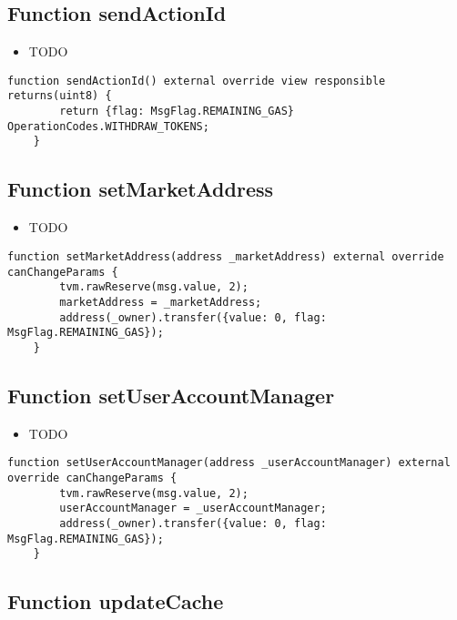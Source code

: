 \subsection{Function sendActionId}

\noindent\begin{itemize}
\item TODO
\end{itemize}

\begin{lstlisting}[firstnumber=59]
    function sendActionId() external override view responsible returns(uint8) {
        return {flag: MsgFlag.REMAINING_GAS} OperationCodes.WITHDRAW_TOKENS;
    }
\end{lstlisting}

\subsection{Function setMarketAddress}

\noindent\begin{itemize}
\item TODO
\end{itemize}

\begin{lstlisting}[firstnumber=67]
    function setMarketAddress(address _marketAddress) external override canChangeParams {
        tvm.rawReserve(msg.value, 2);
        marketAddress = _marketAddress;
        address(_owner).transfer({value: 0, flag: MsgFlag.REMAINING_GAS});
    }
\end{lstlisting}

\subsection{Function setUserAccountManager}

\noindent\begin{itemize}
\item TODO
\end{itemize}

\begin{lstlisting}[firstnumber=73]
    function setUserAccountManager(address _userAccountManager) external override canChangeParams {
        tvm.rawReserve(msg.value, 2);
        userAccountManager = _userAccountManager;
        address(_owner).transfer({value: 0, flag: MsgFlag.REMAINING_GAS});
    }
\end{lstlisting}

\subsection{Function updateCache}


